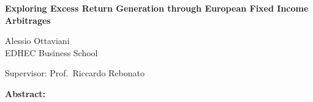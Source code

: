 \clearpage
\thispagestyle{empty}

\begin{center}

\vspace*{1.5in}

{\Large\bfseries Exploring Excess Return Generation through European Fixed Income Arbitrages}

\vspace{1in}

{\large Alessio Ottaviani}\\[0.5em]
EDHEC Business School

\vspace{0.3in}

{\normalsize Supervisor: Prof.\ Riccardo Rebonato}

\end{center}

\vspace{0.8in}

\noindent\textbf{Abstract:} 

\vspace{0.3in}


\vspace{0.3in}

